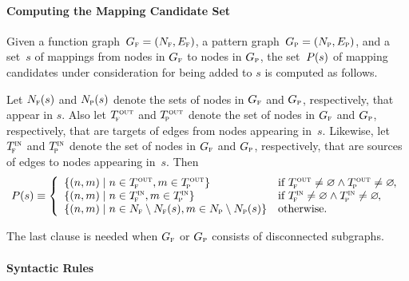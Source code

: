 \paragraph{Computing the Mapping Candidate Set}

Given a \gls{function graph}~\mbox{$\fG = \mPair{\fN}{\fE}$}, a \gls{pattern
  graph}~\mbox{$\pG = \mPair{\pN}{\pE}$}, and a set~$s$ of mappings from
\glspl{node} in $G_{\textrm{\textsc{f}}}$ to \glspl{node} in $G_{\textrm{\textsc{p}}}$, the set~$P(s)$ of mapping
candidates under consideration for being added to $s$ is computed as follows.
%
\begin{definition}
  Let $N_{\textrm{\textsc{f}}}(s)$ and $N_{\textrm{\textsc{p}}}(s)$ denote the sets of \glspl{node} in $G_{\textrm{\textsc{f}}}$ and $G_{\textrm{\textsc{p}}}$,
  respectively, that appear in $s$.
  Also let $T_{\!\textrm{\textsc{f}}}^{\hspace{.5pt}\textrm{\textsc{out}}}$ and $T_{\!\textrm{\textsc{p}}}^{\hspace{.5pt}\textrm{\textsc{out}}}$ denote the set of \glspl{node} in $G_{\textrm{\textsc{f}}}$ and
  $G_{\textrm{\textsc{p}}}$, respectively, that are targets of \glspl{edge} from \glspl{node}
  appearing in~$s$.
  Likewise, let $T_{\!\textrm{\textsc{f}}}^{\textrm{\textsc{in}}}$ and $T_{\!\textrm{\textsc{p}}}^{\textrm{\textsc{in}}}$ denote the set of \glspl{node} in $G_{\textrm{\textsc{f}}}$ and
  $G_{\textrm{\textsc{p}}}$, respectively, that are sources of \glspl{edge} to \glspl{node}
  appearing in~$s$.
  Then
  \begin{displaymath}
    \mCandSet \equiv
    \left\{
    \begin{array}{ll}
        \mSetBuilder{\mPair{n}{m}}{n \in \fTout, m \in \pTout}
      & \text{if} \ \fTout \neq \emptyset \mAnd \pTout \neq \emptyset
        \hspace{-1pt}, \\
        \mSetBuilder{\mPair{n}{m}}{n \in \fTin, m \in \pTin}
      & \text{if} \ \fTin \neq \emptyset \mAnd \pTin \neq \emptyset
        \hspace{-1pt}, \\
        \mSetBuilder{\mPair{n}{m}}{
                                    n \in \fN \setminus \fN(s),
                                    m \in \pN \setminus \pN(s)
                                  }
      & \text{otherwise}.
    \end{array}
    \right.
  \end{displaymath}%
\end{definition}
%
The last clause is needed when $G_{\textrm{\textsc{f}}}$ or $G_{\textrm{\textsc{p}}}$ consists of disconnected
\glspl{subgraph}.


\paragraph{Syntactic Rules}

\def\mSynPredRule{R_{\mathsc{pred}}}
\def\mSynSuccRule{R_{\mathsc{succ}}}
\def\mSynInRule{R_{\mathsc{in}}}
\def\mSynOutRule{R_{\mathsc{out}}}
\def\mSynNewRule{R_\mathsc{new}}

